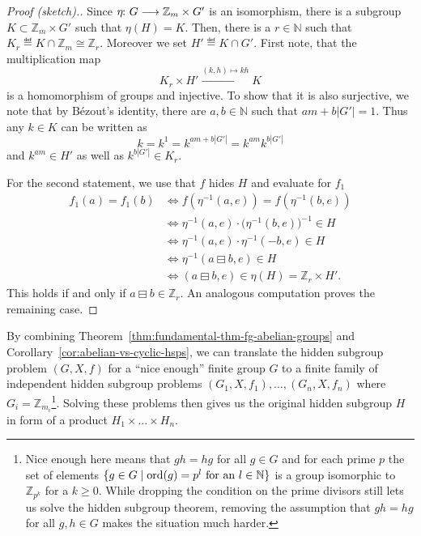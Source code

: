 \documentclass[a4paper, oneside, 12pt]{amsart}
\begin{document}
\begin{proof}[Proof (sketch).]
  Since \(\eta \from G \to \mathbb{Z}_{m}\times G'\) is an isomorphism,
  there is a subgroup \(K\subset \mathbb{Z}_{m} \times G' \) such that \(\eta(H) = K\).
  Then, there is a \(r\in \mathbb{N}\) such that  \(K_{r} \eqdef K \cap \mathbb{Z}_{m} \cong \mathbb{Z}_{r}\).
  Moreover we set \(H' \eqdef K \cap G'\).
  First note, that the multiplication map
  \begin{equation*}
    K_{r} \times H' \xrightarrow{(k,h)\mapsto kh} K
  \end{equation*}
  is a homomorphism of groups and injective.
  To show that it is also surjective,
  we note that by Bézout's identity, there are \(a,b \in \mathbb{N}\) such that \(am + b|G'| = 1\).
  Thus any \(k\in K\) can be written as
  \begin{equation*}
    k = k^{1} = k^{am + b|G'|} = k^{am} k^{b|G'|}
  \end{equation*}
  and \(k^{am}\in H' \) as well as \(k^{b|G'|} \in K_{r}\).


  For the second statement,  we use  that \(f\) hides \(H\) and evaluate  for \(f_1\)
  \begin{align*}
    f_1(a) = f_1(b) &\iff f(\eta^{-1}(a, e)) = f(\eta^{-1}(b, e)) \\
                  &\iff \eta^{-1}(a, e) \cdot \big(\eta^{-1}(b, e)\big)^{-1} \in H \\
                  &\iff \eta^{-1}(a, e) \cdot \eta^{-1}(-b, e) \in H \\
                  &\iff \eta^{-1}(a \boxminus b, e) \in H \\
                  &\iff (a \boxminus b, e) \in \eta(H) = \mathbb{Z}_r \times H'.
  \end{align*}
  This holds if and only if \(a \boxminus b \in \mathbb{Z}_r\).
  An analogous computation proves the remaining case.
\end{proof}

By combining Theorem~\ref{thm:fundamental-thm-fg-abelian-groups} and Corollary~\ref{cor:abelian-vs-cyclic-hsps}, we can translate the  hidden subgroup problem \((G,X,f)\) for a ``nice enough'' finite group \(G\) to a finite family of independent hidden subgroup problems
\((G_1, X, f_1), \dots, (G_n, X, f_n)\) where \(G_{i}= \mathbb{Z}_{m_{i}}\)\footnote{%
  Nice enough here means that \(gh=hg\) for all \(g\in G\) and for each prime \(p\) the set of elements \(\{g\in G\mid \operatorname{ord}(g) = p^{l} \text{ for an } l \in \mathbb{N}\}\) is a group isomorphic to \( \mathbb{Z}_{p^{k}}\) for a \(k\geq 0\).
  While dropping the condition on the prime divisors still lets us solve the hidden subgroup theorem, removing the assumption that \(gh=hg\) for all \(g,h\in G\) makes the situation much harder.
}.
Solving these problems then gives us the original hidden subgroup \(H\) in form of a product \(H_{1}\times  \dots \times H_{n}\).
\end{document}

